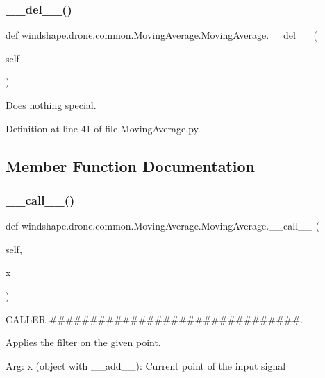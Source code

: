 \subsubsection{\texorpdfstring{\+\_\+\+\_\+del\+\_\+\+\_\+()}{\_\_del\_\_()}}
{\footnotesize\ttfamily def windshape.\+drone.\+common.\+Moving\+Average.\+Moving\+Average.\+\_\+\+\_\+del\+\_\+\+\_\+ (\begin{DoxyParamCaption}\item[{}]{self }\end{DoxyParamCaption})}

\begin{DoxyVerb}Does nothing special.\end{DoxyVerb}
 

Definition at line 41 of file Moving\+Average.\+py.



\subsection{Member Function Documentation}
\mbox{\label{classwindshape_1_1drone_1_1common_1_1_moving_average_1_1_moving_average_adc79175d843a7cb13f870a75cdb65648}} 
\subsubsection{\texorpdfstring{\+\_\+\+\_\+call\+\_\+\+\_\+()}{\_\_call\_\_()}}
{\footnotesize\ttfamily def windshape.\+drone.\+common.\+Moving\+Average.\+Moving\+Average.\+\_\+\+\_\+call\+\_\+\+\_\+ (\begin{DoxyParamCaption}\item[{}]{self,  }\item[{}]{x }\end{DoxyParamCaption})}



C\+A\+L\+L\+ER \#\#\#\#\#\#\#\#\#\#\#\#\#\#\#\#\#\#\#\#\#\#\#\#\#\#\#\#\#\#\#. 

\begin{DoxyVerb}Applies the filter on the given point.

Arg:
    x (object with __add__): Current point of the input signal
\end{DoxyVerb}
 

